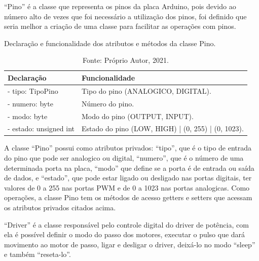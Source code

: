 “Pino” é a classe que representa os pinos da placa Arduino, pois devido ao número alto de vezes que foi 
necessário a utilização dos pinos, foi definido que seria melhor a criação de uma classe para facilitar 
as operações com pinos. 


\begin{table}
    \centering
    \caption{Declaração e funcionalidade dos atributos e métodos da classe Pino.}
    \begin{tabular}{lp{9cm}}
        \hline
        \textbf{Declaração} & \textbf{Funcionalidade}\\
        \hline
        - tipo: TipoPino & Tipo do pino (ANALOGICO, DIGITAL).\\
        - numero: byte & Número do pino.\\
        - modo: byte & Modo do pino (OUTPUT, INPUT).\\
        - estado: unsigned int & Estado do pino (LOW, HIGH) | (0, 255) | (0, 1023).\\
        \hline       
    \end{tabular}
    \caption*{Fonte: Próprio Autor, 2021.}
    \label{tab:classepino}
\end{table}

A classe “Pino” possui como atributos privados: “tipo”, que é o tipo de entrada do pino que pode ser 
analogico ou digital, “numero”, que é o número de uma determinada porta na placa, “modo” que define se 
a porta é de entrada ou saída de dados, e “estado”, que pode estar ligado ou desligado nas portas digitais, 
ter valores de 0 a 255 nas portas PWM e de 0 a 1023 nas portas analogicas. Como operações, a classe Pino 
tem os métodos de acesso getters e setters que acessam os atributos privados citados acima.

“Driver” é a classe responsável pelo controle digital do driver de potência, com ela é possível definir 
o modo do passo dos motores, executar o pulso que dará movimento ao motor de passo, ligar e desligar 
o driver, deixá-lo no modo “sleep” e também “reseta-lo”.


